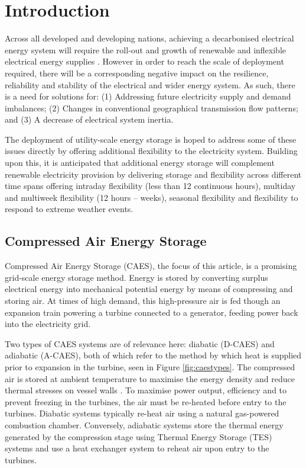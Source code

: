 \documentclass[preprint,12pt]{elsarticle}
\begin{document}

\section{Introduction}
\label{sec:sample1}
Across all developed and developing nations, achieving a decarbonised electrical energy system will require the roll-out and growth of renewable and inflexible electrical energy supplies \cite{BloombergNEF}. However in order to reach the scale of deployment required, there will be a corresponding negative impact on the resilience, reliability and stability of the electrical and wider energy system. As such, there is a need for solutions for: (1) Addressing future electricity supply and demand imbalances; (2) Changes in conventional geographical transmission flow patterns; and (3) A decrease of electrical system inertia.

The deployment of utility-scale energy storage is hoped to address some of these issues directly by offering additional flexibility to the electricity system. Building upon this, it is anticipated that additional energy storage will complement renewable electricity provision by delivering storage and flexibility across different time spans offering intraday flexibility (less than 12 continuous hours), multiday and multiweek flexibility (12 hours – weeks), seasonal flexibility and flexibility to respond to extreme weather events.

\subsection{Compressed Air Energy Storage}
Compressed Air Energy Storage (CAES), the focus of this article, is a promising grid-scale energy storage method. Energy is stored by converting surplus electrical energy into mechanical potential energy by means of compressing and storing air. At times of high demand, this high-pressure air is fed though an expansion train powering a turbine connected to a generator, feeding power back into the electricity grid. 

Two types of CAES systems are of relevance here: diabatic (D-CAES) and adiabatic (A-CAES), both of which refer to the method by which heat is supplied prior to expansion in the turbine, seen in Figure \ref{fig:caestypes}. The compressed air is stored at ambient temperature to maximise the energy density and reduce thermal stresses on vessel walls \cite{Geissbuhler2018}. To maximise power output, efficiency and to prevent freezing in the turbines, the air must be re-heated before entry to the turbines. Diabatic systems typically re-heat air using a natural gas-powered combustion chamber. Conversely, adiabatic systems store the thermal energy generated by the compression stage using Thermal Energy Storage (TES) systems and use a heat exchanger system to reheat air upon entry to the turbines.
\end{document}
